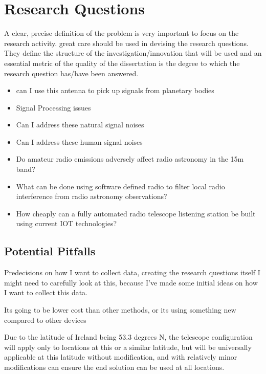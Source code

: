 \documentclass[runningheads,a4paper]{llncs}
\begin{document}
%
%
\newpage
\section*{Research Questions}
A clear, precise definition of the problem is very important to focus on the research activity. great care should be used in devising the research questions. They define the structure of the investigation/innovation that will be used and an essential metric of the quality of the dissertation is the degree to which the research question has/have been answered.

\begin{itemize}
  \item can I use this antenna to pick up signals from planetary bodies
  \item Signal Processing issues
  \item Can I address these natural signal noises
  \item Can I address these human signal noises
\end{itemize}

\begin{itemize}
  \item Do amateur radio emissions adversely affect radio astronomy in the 15m band?
  \item What can be done using software defined radio to filter local radio interference from radio astronomy observations?
  \item How cheaply can a fully automated radio telescope listening station be built using current IOT technologies?
\end{itemize}

%
%
\subsection*{Potential Pitfalls}
Predecisions on how I want to collect data, creating the research questions itself I might need to carefully look at this, because I've made some initial ideas on how I want to collect this data.

Its going to be lower cost than other methods, or its using something new compared to other devices

Due to the latitude of Ireland being 53.3 degrees N, the telescope configuration will apply only to locations at this or a similar latitude, but will be universally applicable at this latitude without modification, and with relatively minor modifications can ensure the end solution can be used at all locations. \cite{kivelson96}
\end{document}
